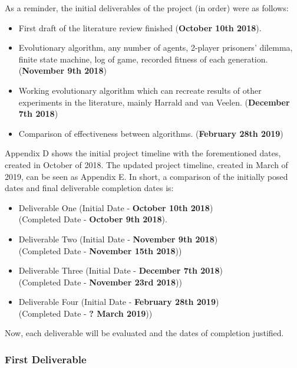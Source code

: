 \documentclass[12pt,a4paper]{article}
\begin{document}
As a reminder, the initial deliverables of the project (in order) were as follows: 

\begin{itemize}
  \item First draft of the literature review finished (\textbf{October 10th 2018}).
  \item Evolutionary algorithm, any number of agents, 2-player prisoners' dilemma, finite state machine, log of game, recorded fitness of each generation. (\textbf{November 9th 2018})
  \item Working evolutionary algorithm which can recreate results of other experiments in the literature, mainly Harrald and van Veelen. (\textbf{December 7th 2018})
  \item Comparison of effectiveness between algorithms. (\textbf{February 28th 2019}) \\
\end{itemize}

Appendix D shows the initial project timeline with the forementioned dates, created in October of 2018. The updated project timeline, created in March of 2019, can be seen as Appendix E. In short, a comparison of the initially posed dates and final deliverable completion dates is: \\

\begin{itemize}
  \item Deliverable One (Initial Date - \textbf{October 10th 2018}) \\ (Completed Date - \textbf{October 9th 2018}).
  \item Deliverable Two (Initial Date - \textbf{November 9th 2018}) \\ (Completed Date - \textbf{November 15th 2018}))
  \item Deliverable Three (Initial Date - \textbf{December 7th 2018}) \\ (Completed Date - \textbf{November 23rd 2018}))
  \item Deliverable Four (Initial Date - \textbf{February 28th 2019}) \\ (Completed Date - \textbf{? March 2019})) \\
\end{itemize}

Now, each deliverable will be evaluated and the dates of completion justified.

\subsubsection{First Deliverable}
\end{document}
